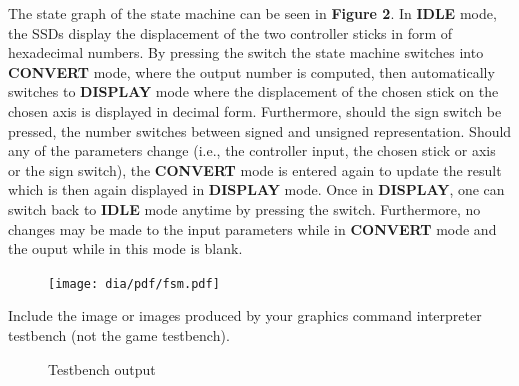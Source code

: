 \documentclass[10pt,a4paper,titlepage,oneside]{article}
\begin{document}
\newpage

\begin{qa}{The state graph of the state machine can be seen in \textbf{Figure 2}. In \textbf{IDLE} mode, the SSDs display the displacement of the two controller
	   sticks in form of hexadecimal numbers. By pressing the switch the state machine switches into \textbf{CONVERT} mode, where the output number is computed, then automatically
	   switches to \textbf{DISPLAY} mode where the displacement of the chosen stick on the chosen axis is displayed in decimal form. Furthermore, should the sign switch be pressed, 
           the number switches between signed and unsigned representation. Should any of the parameters change (i.e., the controller input, the chosen stick or axis or the sign
           switch), the \textbf{CONVERT} mode is entered again to update the result which is then again displayed in \textbf{DISPLAY} mode. Once in \textbf{DISPLAY}, one can
	   switch back to \textbf{IDLE} mode anytime by pressing the switch. Furthermore, no changes may be made to the input parameters while in \textbf{CONVERT} mode and the ouput while
	   in this mode is blank.}

\begin{figure}[h!]
	\centering
	\texttt{[image: dia/pdf/fsm.pdf]}
\end{figure}

\end{qa}



\begin{qa}{Include the image or images produced by your graphics command interpreter testbench (not the game testbench).}


\begin{figure}[h!]
	\centering
	\dummyimage
	\caption{Testbench output}
\end{figure}

\end{qa}
\end{document}

